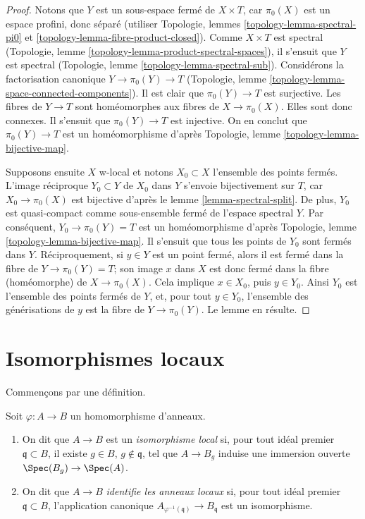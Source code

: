 \begin{proof}
Notons que $Y$ est un sous-espace ferm\'e de $X \times T$, car $\pi_0(X)$
est un espace profini, donc s\'epar\'e
(utiliser Topologie, lemmes \ref{topology-lemma-spectral-pi0} et
\ref{topology-lemma-fibre-product-closed}).
Comme $X \times T$ est spectral
(Topologie, lemme \ref{topology-lemma-product-spectral-spaces}),
il s'ensuit que $Y$ est spectral
(Topologie, lemme \ref{topology-lemma-spectral-sub}).
Consid\'erons la factorisation canonique $Y \to \pi_0(Y) \to T$
(Topologie, lemme \ref{topology-lemma-space-connected-components}).
Il est clair que $\pi_0(Y) \to T$ est surjective.
Les fibres de $Y \to T$ sont hom\'eomorphes aux fibres de
$X \to \pi_0(X)$. Elles sont donc connexes. Il s'ensuit
que $\pi_0(Y) \to T$ est injective. On en conclut que $\pi_0(Y) \to T$
est un hom\'eomorphisme d'apr\`es
Topologie, lemme \ref{topology-lemma-bijective-map}.

\medskip\noindent
Supposons ensuite $X$ w-local et notons $X_0 \subset X$
l'ensemble des points ferm\'es. L'image r\'eciproque $Y_0 \subset Y$ de $X_0$ dans
$Y$ s'envoie bijectivement sur $T$, car $X_0 \to \pi_0(X)$ est bijective
d'apr\`es le lemme \ref{lemma-spectral-split}. De plus, $Y_0$ est quasi-compact
comme sous-ensemble ferm\'e de l'espace spectral $Y$. Par cons\'equent,
$Y_0 \to \pi_0(Y) = T$ est un hom\'eomorphisme d'apr\`es
Topologie, lemme \ref{topology-lemma-bijective-map}.
Il s'ensuit que tous les points de $Y_0$ sont ferm\'es dans $Y$.
R\'eciproquement, si $y \in Y$ est un point ferm\'e, alors
il est ferm\'e dans la fibre de $Y \to \pi_0(Y) = T$;
son image $x$ dans $X$ est donc ferm\'e dans la fibre (hom\'eomorphe) de
$X \to \pi_0(X)$. Cela implique $x \in X_0$, puis $y \in Y_0$.
Ainsi $Y_0$ est l'ensemble des points ferm\'es de $Y$,
et, pour tout $y \in Y_0$, l'ensemble des g\'en\'erisations de $y$ est
la fibre de $Y \to \pi_0(Y)$. Le lemme en r\'esulte.
\end{proof}




\section{Isomorphismes locaux}
\label{section-local-isomorphism}

\noindent
Commen\c{c}ons par une d\'efinition.

\begin{definition}
\label{definition-local-isomorphism}
Soit $\varphi : A \to B$ un homomorphisme d'anneaux.
\begin{enumerate}
\item On dit que $A \to B$ est un {\it isomorphisme local} si, pour tout id\'eal premier
$\mathfrak q \subset B$, il existe $g \in B$, $g \not \in \mathfrak q$,
tel que $A \to B_g$ induise une immersion ouverte $\Spec(B_g) \to \Spec(A)$.
\item On dit que $A \to B$ {\it identifie les anneaux locaux} si, pour tout id\'eal premier
$\mathfrak q \subset B$, l'application canonique
$A_{\varphi^{-1}(\mathfrak q)} \to B_\mathfrak q$ est un isomorphisme.
\end{enumerate}
\end{definition}

